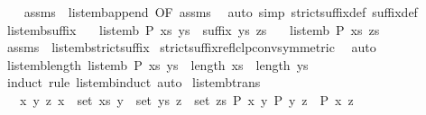 \begin{isabellebody}
%
\isadelimproof
\ \ %
\endisadelimproof
%
\isatagproof
{}\isamarkupfalse%
\ assms{\isacharparenleft}{}{\isacharparenright}\ \ list{\isacharunderscore}emb{\isacharunderscore}append{}\ {\isacharbrackleft}OF\ assms{\isacharparenleft}{}{\isacharparenright}{\isacharbrackright}\ \isamarkupfalse%
\ {\isacharparenleft}auto\ simp{\isacharcolon}\ strict{\isacharunderscore}suffix{\isacharunderscore}def\ suffix{\isacharunderscore}def{\isacharparenright}%
\endisatagproof
{\isafoldproof}%
%
\isadelimproof
\isanewline
%
\endisadelimproof
\isanewline
{}\isamarkupfalse%
\ list{\isacharunderscore}emb{\isacharunderscore}suffix{\isacharcolon}\isanewline
\ \ \ {\isachardoublequoteopen}list{\isacharunderscore}emb\ P\ xs\ ys{\isachardoublequoteclose}\ \ {\isachardoublequoteopen}suffix\ ys\ zs{\isachardoublequoteclose}\isanewline
\ \ \ {\isachardoublequoteopen}list{\isacharunderscore}emb\ P\ xs\ zs{\isachardoublequoteclose}\isanewline
%
\isadelimproof
%
\endisadelimproof
%
\isatagproof
{}\isamarkupfalse%
\ assms\ \ list{\isacharunderscore}emb{\isacharunderscore}strict{\isacharunderscore}suffix\isanewline
{}\isamarkupfalse%
\ strict{\isacharunderscore}suffix{\isacharunderscore}reflclp{\isacharunderscore}conv{\isacharbrackleft}symmetric{\isacharbrackright}\ \isamarkupfalse%
\ auto%
\endisatagproof
{\isafoldproof}%
%
\isadelimproof
\isanewline
%
\endisadelimproof
\isanewline
{}\isamarkupfalse%
\ list{\isacharunderscore}emb{\isacharunderscore}length{\isacharcolon}\ {\isachardoublequoteopen}list{\isacharunderscore}emb\ P\ xs\ ys\ {\isasymLongrightarrow}\ length\ xs\ {\isasymle}\ length\ ys{\isachardoublequoteclose}\isanewline
%
\isadelimproof
\ \ %
\endisadelimproof
%
\isatagproof
{}\isamarkupfalse%
\ {\isacharparenleft}induct\ rule{\isacharcolon}\ list{\isacharunderscore}emb{\isachardot}induct{\isacharparenright}\ auto%
\endisatagproof
{\isafoldproof}%
%
\isadelimproof
\isanewline
%
\endisadelimproof
\isanewline
{}\isamarkupfalse%
\ list{\isacharunderscore}emb{\isacharunderscore}trans{\isacharcolon}\isanewline
\ \ \ {\isachardoublequoteopen}{\isasymAnd}x\ y\ z{\isachardot}\ {\isasymlbrakk}x\ {\isasymin}\ set\ xs{\isacharsemicolon}\ y\ {\isasymin}\ set\ ys{\isacharsemicolon}\ z\ {\isasymin}\ set\ zs{\isacharsemicolon}\ P\ x\ y{\isacharsemicolon}\ P\ y\ z{\isasymrbrakk}\ {\isasymLongrightarrow}\ P\ x\ z{\isachardoublequoteclose}\isanewline

\end{isabellebody}
